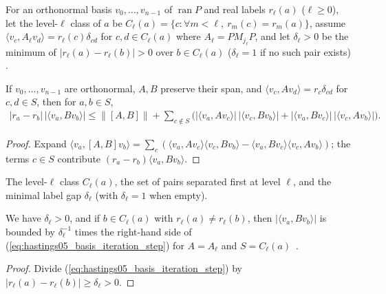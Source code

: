 For an orthonormal basis $v_0,\dots,v_{n-1}$ of $\operatorname{ran}P$ and real
labels $r_\ell(a)$ ($\ell\ge0$), let the level-$\ell$ class of $a$ be
$C_\ell(a)=\{c:\forall m<\ell,\ r_m(c)=r_m(a)\}$, assume
$\langle v_c,A_\ell v_d\rangle=r_\ell(c)\delta_{cd}$ for $c,d\in C_\ell(a)$ where
$A_\ell=PM_{j_\ell}P$, and let $\delta_\ell>0$ be the minimum of
$|r_\ell(a)-r_\ell(b)|>0$ over $b\in C_\ell(a)$ ($\delta_\ell=1$ if no such
pair exists) \cite[lines 1695--1705]{Hastings2006Solving}.

\begin{lemma}
    \label{thm:hastings05_basis_iteration_step}
    \leanok
    If $v_0,\dots,v_{n-1}$ are orthonormal, $A,B$ preserve their span, and
    $\langle v_c,Av_d\rangle=r_c\delta_{cd}$ for $c,d\in S$, then for $a,b\in S$,
    \begin{align}
        |r_a-r_b|\,|\langle v_a,Bv_b\rangle|
        \le\|[A,B]\|+\sum_{c\notin S}\bigl(|\langle v_a,Av_c\rangle|\,
        |\langle v_c,Bv_b\rangle|+|\langle v_a,Bv_c\rangle|\,
        |\langle v_c,Av_b\rangle|\bigr).
        \label{eq:hastings05_basis_iteration_step}
    \end{align}
\end{lemma}
\begin{proof}\leanok
    Expand $\langle v_a,[A,B]v_b\rangle
        =\sum_c(\langle v_a,Av_c\rangle\langle v_c,Bv_b\rangle
        -\langle v_a,Bv_c\rangle\langle v_c,Av_b\rangle)$; the terms $c\in S$
    contribute $(r_a-r_b)\langle v_a,Bv_b\rangle$.
\end{proof}

\begin{definition}
    \label{def:hastings05_basis_iteration_levels}
    \leanok
    The level-$\ell$ class $C_\ell(a)$, the set of pairs separated first at
    level $\ell$, and the minimal label gap $\delta_\ell$ (with $\delta_\ell=1$
    when empty).
\end{definition}

\begin{lemma}
    \label{thm:hastings05_basis_iteration}
    \leanok
    We have $\delta_\ell>0$, and if $b\in C_\ell(a)$ with
    $r_\ell(a)\ne r_\ell(b)$, then $|\langle v_a,Bv_b\rangle|$ is bounded by
    $\delta_\ell^{-1}$ times the right-hand side of
    (\ref{eq:hastings05_basis_iteration_step}) for $A=A_\ell$ and
    $S=C_\ell(a)$~\cite{gap:hastings05_two_dim_ground_basis}.
\end{lemma}
\begin{proof}\leanok
    Divide (\ref{eq:hastings05_basis_iteration_step}) by
    $|r_\ell(a)-r_\ell(b)|\ge\delta_\ell>0$.
\end{proof}

